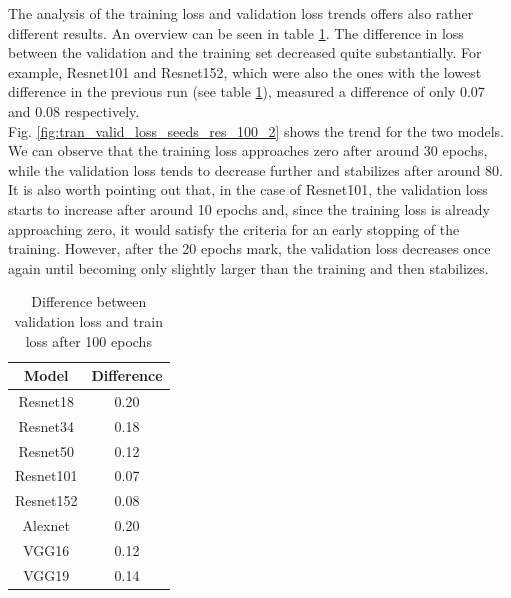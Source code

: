 The analysis of the training loss and validation loss trends offers also rather different results. An overview can be seen in table \ref{tab:difference_val_tra_loss_2}. The difference in loss between the validation and the training set decreased quite substantially. For example, Resnet101 and Resnet152, which were also the ones with the lowest difference in the previous run (see table \ref{tab:difference_val_tra_loss_2}), measured a difference of only 0.07 and 0.08 respectively. \\
Fig. \ref{fig:tran_valid_loss_seeds_res_100_2} shows the trend for the two models. We can observe that the training loss approaches zero after around 30 epochs, while the validation loss tends to decrease further and stabilizes after around 80. It is also worth pointing out that, in the case of Resnet101, the validation loss starts to increase after around 10 epochs and, since the training loss is already approaching zero, it would satisfy the criteria for an early stopping of the training. However, after the 20 epochs mark, the validation loss decreases once again until becoming only slightly larger than the training and then stabilizes. 

\begin{table}[h]
\centering
        \begin{tabular}{ c c  }
                 Model&Difference\\
                 \hline
                   Resnet18&0.20\\
Resnet34&0.18\\
Resnet50&0.12\\
Resnet101&0.07\\
Resnet152&0.08\\
Alexnet&0.20\\
VGG16&0.12\\
VGG19&0.14\\
                    \end{tabular}
                    \caption{Difference between validation loss and train loss after 100 epochs }                   
                     \label{tab:difference_val_tra_loss_2}
     \end{table} 
     
